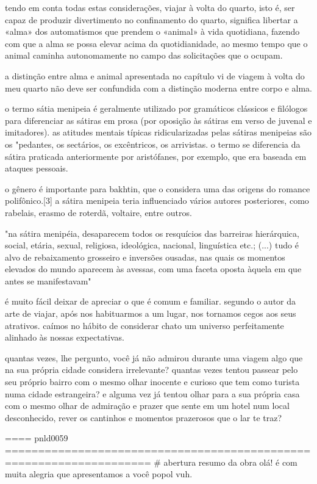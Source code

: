 tendo em conta todas estas considerações, viajar à volta do quarto, isto é, ser capaz de produzir divertimento no confinamento do quarto, significa libertar a «alma» dos
automatismos que prendem o «animal» à vida quotidiana, fazendo com que a alma se
possa elevar acima da quotidianidade, ao mesmo tempo que o animal caminha autonomamente no campo das solicitações que o ocupam.

a distinção entre alma e animal apresentada no capítulo vi de viagem à volta do meu quarto não deve ser confundida com a distinção moderna entre corpo e alma. 

o termo sátia menipeia é geralmente utilizado por gramáticos clássicos e filólogos para diferenciar as sátiras em prosa (por oposição às sátiras em verso de juvenal e imitadores). as atitudes mentais típicas ridicularizadas pelas sátiras menipeias são os "pedantes, os sectários, os excêntricos, os arrivistas. o termo se diferencia da sátira praticada anteriormente por aristófanes, por exemplo, que era baseada em ataques pessoais. 

o gênero é importante para bakhtin, que o considera uma das origens do romance polifônico.[3] a sátira menipeia teria influenciado vários autores posteriores, como rabelais, erasmo de roterdã, voltaire, entre outros.

"na sátira menipéia, desaparecem todos os resquícios das barreiras hierárquica, social, etária, sexual, religiosa, ideológica, nacional, linguística etc.; (...) tudo é alvo de rebaixamento grosseiro e inversões ousadas, nas quais os momentos elevados do mundo aparecem às avessas, com uma faceta oposta àquela em que antes se manifestavam"

é muito fácil deixar de apreciar o que é comum e familiar. segundo o autor da arte de viajar, após nos habituarmos a um lugar, nos tornamos cegos aos seus atrativos. caímos no hábito de considerar chato um universo perfeitamente alinhado às nossas expectativas.

quantas vezes, lhe pergunto, você já não admirou durante uma viagem algo que na sua própria cidade considera irrelevante? quantas vezes tentou passear pelo seu próprio bairro com o mesmo olhar inocente e curioso que tem como turista numa cidade estrangeira? e alguma vez já tentou olhar para a sua própria casa com o mesmo olhar de admiração e prazer que sente em um hotel num local desconhecido, rever os cantinhos e momentos prazerosos que o lar te traz?


==== pnld0059 ====================================================================
# abertura resumo da obra
olá! é com muita alegria que apresentamos a você popol vuh.


